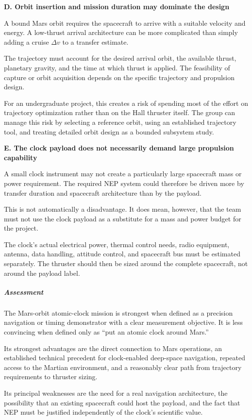 \textbf{D. Orbit insertion and mission duration may dominate
	the design}

A bound Mars orbit requires the spacecraft to arrive with a
suitable velocity and energy. A low-thrust arrival architecture
can be more complicated than simply adding a cruise \(\Delta v\)
to a transfer estimate.

The trajectory must account for the desired arrival orbit, the
available thrust, planetary gravity, and the time at which thrust
is applied. The feasibility of capture or orbit acquisition
depends on the specific trajectory and propulsion design.

For an undergraduate project, this creates a risk of spending
most of the effort on trajectory optimization rather than on
the Hall thruster itself. The group can manage this risk by
selecting a reference orbit, using an established trajectory
tool, and treating detailed orbit design as a bounded subsystem
study.

\textbf{E. The clock payload does not necessarily demand
	large propulsion capability}

A small clock instrument may not create a particularly large
spacecraft mass or power requirement. The required NEP system
could therefore be driven more by transfer duration and spacecraft
architecture than by the payload.

This is not automatically a disadvantage. It does mean, however,
that the team must not use the clock payload as a substitute
for a mass and power budget for the project.

The clock's actual electrical power, thermal control needs,
radio equipment, antenna, data handling, attitude control, and
spacecraft bus must be estimated separately. The thruster should
then be sized around the complete spacecraft, not around the
payload label.

\subparagraph{Assessment}

The Mars-orbit atomic-clock mission is strongest when defined as
a precision navigation or timing demonstrator with a clear
measurement objective. It is less convincing when defined only
as ``put an atomic clock around Mars.''

Its strongest advantages are the direct connection to Mars
operations, an established technical precedent for clock-enabled
deep-space navigation, repeated access to the Martian environment,
and a reasonably clear path from trajectory requirements to
thruster sizing.

Its principal weaknesses are the need for a real navigation
architecture, the possibility that an existing spacecraft could
host the payload, and the fact that NEP must be justified
independently of the clock's scientific value.

